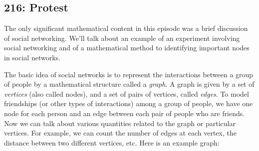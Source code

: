 \newpage
\subsection{216: Protest}\label{216}

The only significant mathematical content in this episode was a brief discussion of social networking. We'll talk about an example of an experiment involving social networking and of a mathematical method to identifying important nodes in social networks. \\


The basic idea of social networks is to represent the interactions between a group of people by a mathematical structure called a \emph{graph}. A graph is given by a set of \emph{vertices} (also called nodes), and a set of pairs of vertices, called \emph{edges}. To model friendships (or other types of interactions) among a group of people, we have one node for each person and an edge between each pair of people who are friends. Now we can talk about various quantities related to the graph or particular vertices. For example, we can count the number of edges at each vertex, the distance between two different vertices, etc. Here is an example graph:













































